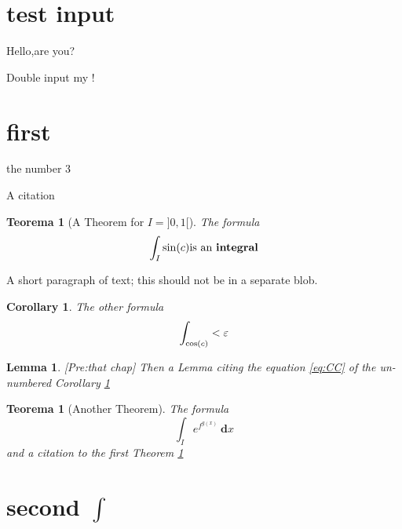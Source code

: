 \documentclass[a4paper,%
twoside]{article}
\def\nr{4}
\def\nr_b{3}
\newcounter{myCount}
\newtheorem{Theorem}%
[myCount]{Teorema}
\newtheorem*{Cor}%
{Corollary}
\newtheorem{Lem}%
{Lemma}
\newcommand\prerequisites[1]{{[Pre:#1]}}
\begin{document}
\section{test input}
%
Hello,are you?

Double input my !

\section{first}%
the number \nr_b

A citation \cite{wiki:it:tautol}

\begin{Theorem}[A  Theorem for {$I=]0,1[$}]
  \label{CT}
  The formula
\[ \int_I {\sin(c)} \hbox{is an \textbf{integral}}\]
\end{Theorem}

A short paragraph of text; this should not be in a separate blob.

\begin{Cor}
  \label{CC}
  The other formula
  \begin{equation}%
    \label{eq:CC}
    \int_{\cos(c)} < \e
  \end{equation}
\end{Cor}
\begin{Lem}\label{lem:2}
  \prerequisites {\emph{that chap}}
  Then a Lemma citing the equation \ref{eq:CC} of the un-numbered Corollary \ref{CC}
\end{Lem}

\begin{Theorem}%
  [Another Theorem]
  \label{AT}
  The formula
  \[ \int_I{e^{f^{g(x)}}} \ \textbf{d}x \]
  and a citation to the first Theorem \ref{CT}
\end{Theorem}


\section*{second $\int$}
\end{document}
